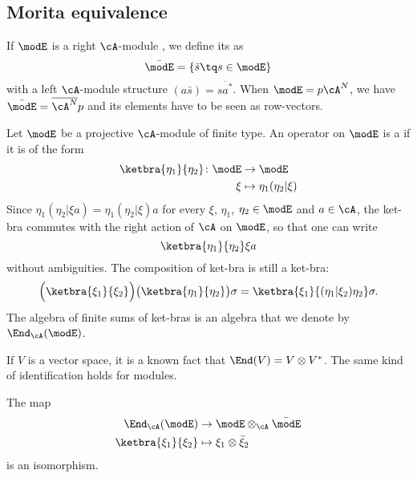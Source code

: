 \subsection{Morita equivalence}

If $\modE$ is a right $\cA$-module , we define its  as
\begin{equation}
	\bar\modE=\{ \bar s\tq s\in\modE \}
\end{equation}
with a left $\cA$-module structure $(a\bar s)=\overline{  sa^* }$. When $\modE=p\cA^N$, we have $\bar\modE=\overline{ \cA^N }p$ and its elements have to be seen as row-vectors.

Let $\modE$ be a projective $\cA$-module of finite type. An operator on $\modE$ is a  if it is of the form
\begin{equation}
	\begin{aligned}
		\ketbra{\eta_1}{\eta_2} \colon \modE & \to \modE                     \\
		\xi                                  & \mapsto \eta_1( \eta_2 | \xi)
	\end{aligned}
\end{equation}
Since $\eta_1( \eta_2 | \xi a) =\eta_1( \eta_2 | \xi) a$ for every $\xi$, $\eta_1$, $\eta_2\in\modE$ and $a\in\cA$, the ket-bra commutes with the right action of $\cA$ on $\modE$, so that one can write
\[
	\ketbra{\eta_1}{\eta_2} \xi a
\]
without ambiguities. The composition of ket-bra is still a ket-bra:
\begin{equation}
	\Big( \ketbra{\xi_1}{\xi_2}  \Big)\big( \ketbra{\eta_1}{\eta_2}  \big)\sigma = \ketbra{\xi_1}{( \eta_1 | \xi_2) \eta_2} \sigma.
\end{equation}
The algebra of finite sums of ket-bras is an algebra that we denote by $\End_{\cA}(\modE)$.

If $V$ is a vector space, it is a known fact that $\End(V)=V\otimes V^*$. The same kind of identification holds for modules.
\begin{proposition}
	The map
	\begin{equation}
		\begin{aligned}
			\End_{\cA}(\modE)     & \to \modE\otimes_{\cA}\bar\modE \\
			\ketbra{\xi_1}{\xi_2} & \mapsto \xi_1\otimes\bar\xi_2
		\end{aligned}
	\end{equation}
	is an isomorphism.
\end{proposition}

